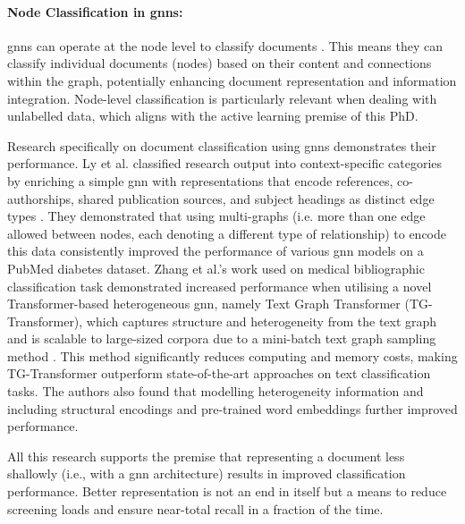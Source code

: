 \documentclass[10pt,oneside]{book}
\begin{document}
\paragraph{Node Classification in \glspl*{gnn}:}
\glspl*{gnn} can operate at the node level to classify documents \cite{kipf_semi-supervised_2017, yao_graph_2018, wang_graph_2024, rong_dropedge_2020}. This means they can classify individual documents (nodes) based on their content and connections within the graph, potentially enhancing document representation and information integration. Node-level classification is particularly relevant when dealing with unlabelled data, which aligns with the active learning premise of this PhD.

Research specifically on document classification using \glspl*{gnn} demonstrates their performance. Ly et al. classified research output into context-specific categories by enriching a simple \gls*{gnn} with representations that encode references, co-authorships, shared publication sources, and subject headings as distinct edge types \cite{ly_article_2024}. They demonstrated that using multi-graphs (i.e. more than one edge allowed between nodes, each denoting a different type of relationship) to encode this data consistently improved the performance of various \gls*{gnn} models on a PubMed diabetes dataset. Zhang et al.'s work used on medical bibliographic classification task demonstrated increased performance when utilising a novel Transformer-based heterogeneous \gls*{gnn}, namely Text Graph Transformer (TG-Transformer), which captures structure and heterogeneity from the text graph and is scalable to large-sized corpora due to a mini-batch text graph sampling method \cite{zhang_evaluating_2020}. This method significantly reduces computing and memory costs, making TG-Transformer outperform state-of-the-art approaches on text classification tasks. The authors also found that modelling heterogeneity information and including structural encodings and pre-trained word embeddings further improved performance.

All this research supports the premise that representing a document less shallowly (i.e., with a \gls*{gnn} architecture) results in improved classification performance. Better representation is not an end in itself but a means to reduce screening loads and ensure near-total recall in a fraction of the time.
\end{document}
